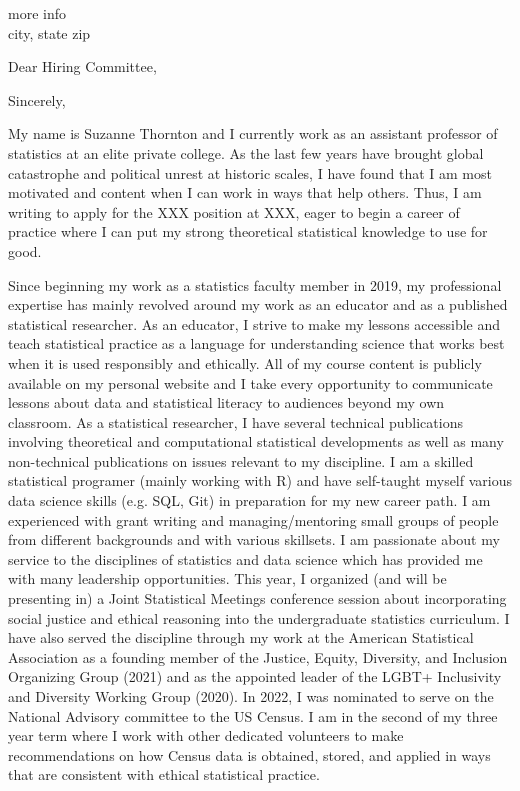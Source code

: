 \documentclass[11pt,a4paper,sans]{moderncv}
\begin{document}
	
	{more info\\ 
	city, state zip}
	\date{\today }
	\opening{Dear Hiring Committee,}
	\closing{Sincerely,}
	\makelettertitle
	
	
	
	
	
	My name is Suzanne Thornton and I currently work as an assistant professor of statistics at an elite private college. As the last few years have brought global catastrophe and political unrest at historic scales, I have found that I am most motivated and content when I can work in ways that help others. Thus, I am writing to apply for the XXX position at XXX, eager to begin a career of practice where I can put my strong theoretical statistical knowledge to use for good.\\ \vspace{.5cm}

Since beginning my work as a statistics faculty member in 2019, my professional expertise has mainly revolved around my work as an educator and as a published statistical researcher. As an educator, I strive to make my lessons accessible and teach statistical practice as a language for understanding science that works best when it is used responsibly and ethically. All of my course content is publicly available on my personal website and I take every opportunity to communicate lessons about data and statistical literacy to audiences beyond my own classroom. As a statistical researcher, I have several technical publications involving theoretical and computational statistical developments as well as many non-technical publications on issues relevant to my discipline. I am a skilled statistical programer (mainly working with R) and have self-taught myself various data science skills (e.g. SQL, Git) in preparation for my new career path. I am experienced with grant writing and managing/mentoring small groups of people from different backgrounds and with various skillsets. %
I am passionate about my service to the disciplines of statistics and data science which has provided me with many leadership opportunities. This year, I organized (and will be presenting in) a Joint Statistical Meetings conference session about incorporating social justice and ethical reasoning into the undergraduate statistics curriculum. I have also served the discipline through my work at the American Statistical Association as a founding member of the Justice, Equity, Diversity, and Inclusion Organizing Group (2021) and as the appointed leader of the LGBT+ Inclusivity and Diversity Working Group (2020). In 2022, I was nominated to serve on the National Advisory committee to the US Census. I am in the second of my three year term where I work with other dedicated volunteers to make recommendations on how Census data is obtained, stored, and applied in ways that are consistent with ethical statistical practice.   
	
\end{document}
